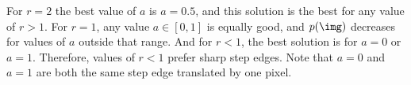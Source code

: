 For $r=2$ the best value of $a$ is $a=0.5$, and this solution is the best for any value of $r>1$. For $r=1$, any value $a \in \left[0,1\right]$ is equally good, and $p(\img)$ decreases for values of $a$ outside that range. And for $r<1$, the best solution is for $a=0$ or $a=1$. Therefore, values of $r<1$ prefer sharp step edges. Note that $a=0$ and $a=1$ are both the same step edge translated by one pixel. 

%
%
%
%
%
%
%
%
%
%
